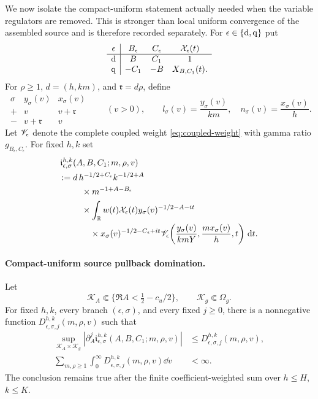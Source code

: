 We now isolate the compact-uniform statement actually needed when the
variable regulators are removed.  This is stronger than local uniform
convergence of the assembled source and is therefore recorded separately.
For $\epsilon\in\{{\rm d},{\rm q}\}$ put
\begin{equation}\label{eq:branch-shift-data}
 \begin{array}{c|ccc}
 \epsilon&B_\epsilon&C_\epsilon&\mathcal X_\epsilon(t)\\ \hline
 {\rm d}&B&C_1&1\\
 {\rm q}&-C_1&-B&X_{B,C_1}(t).
 \end{array}
\end{equation}
For $\rho\geq1$, $d=(h,km)$, and $\mathfrak r=d\rho$, define
\begin{equation}\label{eq:branch-physical-variables}
 \begin{array}{c|cc}
 \sigma&y_\sigma(v)&x_\sigma(v)\\ \hline
 +&v&v+\mathfrak r\\
 -&v+\mathfrak r&v
 \end{array}
 \qquad(v>0),\qquad
 l_\sigma(v)=\frac{y_\sigma(v)}{km},\quad
 n_\sigma(v)=\frac{x_\sigma(v)}h.
\end{equation}
Let $\mathscr V_\epsilon$ denote the complete coupled weight
\eqref{eq:coupled-weight} with gamma ratio
$g_{B_\epsilon,C_\epsilon}$.  For fixed $h,k$ set
\begin{align}
 \mathfrak i_{\epsilon,\sigma}^{h,k}
 &(A,B,C_1;m,\rho,v)\notag\\
 :={}&d\,h^{-1/2+C_\epsilon}k^{-1/2+A}\notag\\
 &\quad\times m^{-1+A-B_\epsilon}\notag\\
 &\quad\times\int_{\mathbb R}w(t)\mathcal X_\epsilon(t)
 y_\sigma(v)^{-1/2-A-it}\notag\\
 &\qquad\times x_\sigma(v)^{-1/2-C_\epsilon+it}
 \mathscr V_\epsilon\!\left(\frac{y_\sigma(v)}{kmY},
                      \frac{mx_\sigma(v)}h,t\right)\,\mathrm d t.
 \label{eq:source-physical-density}
\end{align}

\paragraph{Compact-uniform source pullback domination.}
Let
\[
 \mathscr K_A\Subset\{\Re A<\tfrac12-c_u/2\},\qquad
 \mathscr K_g\Subset\Omega_g.
\]
For fixed $h,k$, every branch $(\epsilon,\sigma)$, and every fixed
$j\geq0$, there is a nonnegative function
$D_{\epsilon,\sigma,j}^{h,k}(m,\rho,v)$ such that
\begin{align}
 \sup_{\mathscr K_A\times\mathscr K_g}
 \left|\partial_A^j\mathfrak i_{\epsilon,\sigma}^{h,k}
 (A,B,C_1;m,\rho,v)\right|
 &\leq D_{\epsilon,\sigma,j}^{h,k}(m,\rho,v),
 \label{eq:compact-source-pointwise}\\
 \sum_{m,\rho\geq1}\int_0^\infty
 D_{\epsilon,\sigma,j}^{h,k}(m,\rho,v)\dd v&<\infty.
 \label{eq:compact-source-L1}
\end{align}
The conclusion remains true after the finite coefficient-weighted sum over
$h\leq H$, $k\leq K$.

